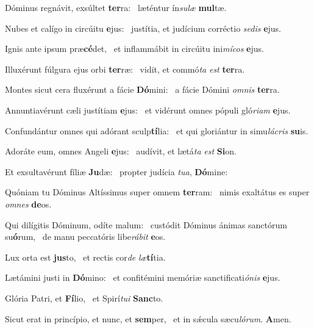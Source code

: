 \item Dóminus regnávit, exsúltet \textbf{ter}ra:~\psstar{} læténtur ín\textit{sulæ} \textbf{mul}tæ.
\item Nubes et calígo in circúitu \textbf{e}jus:~\psstar{} justítia, et judícium corréctio \textit{sedis} \textbf{e}jus.
\item Ignis ante ipsum præ\textbf{cé}det,~\psstar{} et inflammábit in circúitu ini\textit{mícos} \textbf{e}jus.
\item Illuxérunt fúlgura ejus orbi \textbf{ter}ræ:~\psstar{} vidit, et commó\textit{ta} \textit{est} \textbf{ter}ra.
\item Montes sicut cera fluxérunt a fácie \textbf{Dó}mini:~\psstar{} a fácie Dómini \textit{omnis} \textbf{ter}ra.
\item Annuntiavérunt cæli justítiam \textbf{e}jus:~\psstar{} et vidérunt omnes pópuli gló\textit{riam} \textbf{e}jus.
\item Confundántur omnes qui adórant sculp\textbf{tí}lia:~\psstar{} et qui gloriántur in simu\textit{lácris} \textbf{su}is.
\item Adoráte eum, omnes Angeli \textbf{e}jus:~\psstar{} audívit, et lætá\textit{ta} \textit{est} \textbf{Si}on.
\item Et exsultavérunt fíliæ \textbf{Ju}dæ:~\psstar{} propter judícia \textit{tua}, \textbf{Dó}mine:
\item Quóniam tu Dóminus Altíssimus super omnem \textbf{ter}ram:~\psstar{} nimis exaltátus es super \textit{omnes} \textbf{de}os.
\item Qui dilígitis Dóminum, odíte malum:~\pscross{} custódit Dóminus ánimas sanctórum su\textbf{ó}rum,~\psstar{} de manu peccatóris libe\textit{rábit} \textbf{e}os.
\item Lux orta est \textbf{jus}to,~\psstar{} et rectis cor\textit{de} \textit{læ}\textbf{tí}tia.
\item Lætámini justi in \textbf{Dó}mino:~\psstar{} et confitémini memóriæ sanctificati\textit{ónis} \textbf{e}jus.
\item Glória Patri, et \textbf{Fí}lio,~\psstar{} et Spirí\textit{tui} \textbf{Sanc}to.
\item Sicut erat in princípio, et nunc, et \textbf{sem}per,~\psstar{} et in sǽcula sæcu\textit{lórum}. \textbf{A}men.
